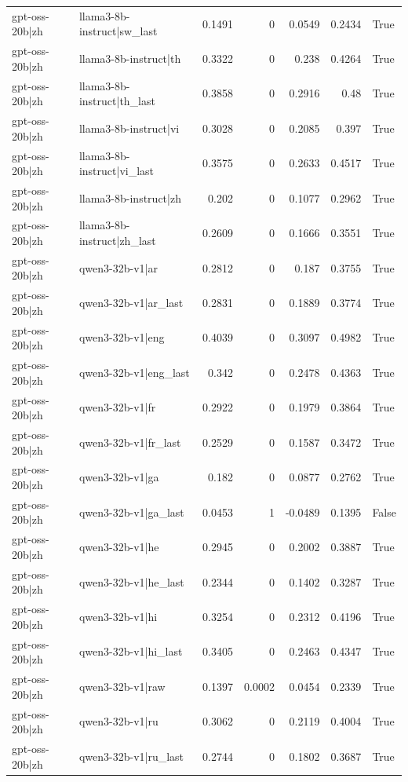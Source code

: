\begin{table}
\begin{tabular}{l l r r r r l}
gpt-oss-20b|zh & llama3-8b-instruct|sw_last & 0.1491 & 0 & 0.0549 & 0.2434 & True \\
gpt-oss-20b|zh & llama3-8b-instruct|th & 0.3322 & 0 & 0.238 & 0.4264 & True \\
gpt-oss-20b|zh & llama3-8b-instruct|th_last & 0.3858 & 0 & 0.2916 & 0.48 & True \\
gpt-oss-20b|zh & llama3-8b-instruct|vi & 0.3028 & 0 & 0.2085 & 0.397 & True \\
gpt-oss-20b|zh & llama3-8b-instruct|vi_last & 0.3575 & 0 & 0.2633 & 0.4517 & True \\
gpt-oss-20b|zh & llama3-8b-instruct|zh & 0.202 & 0 & 0.1077 & 0.2962 & True \\
gpt-oss-20b|zh & llama3-8b-instruct|zh_last & 0.2609 & 0 & 0.1666 & 0.3551 & True \\
gpt-oss-20b|zh & qwen3-32b-v1|ar & 0.2812 & 0 & 0.187 & 0.3755 & True \\
gpt-oss-20b|zh & qwen3-32b-v1|ar_last & 0.2831 & 0 & 0.1889 & 0.3774 & True \\
gpt-oss-20b|zh & qwen3-32b-v1|eng & 0.4039 & 0 & 0.3097 & 0.4982 & True \\
gpt-oss-20b|zh & qwen3-32b-v1|eng_last & 0.342 & 0 & 0.2478 & 0.4363 & True \\
gpt-oss-20b|zh & qwen3-32b-v1|fr & 0.2922 & 0 & 0.1979 & 0.3864 & True \\
gpt-oss-20b|zh & qwen3-32b-v1|fr_last & 0.2529 & 0 & 0.1587 & 0.3472 & True \\
gpt-oss-20b|zh & qwen3-32b-v1|ga & 0.182 & 0 & 0.0877 & 0.2762 & True \\
gpt-oss-20b|zh & qwen3-32b-v1|ga_last & 0.0453 & 1 & -0.0489 & 0.1395 & False \\
gpt-oss-20b|zh & qwen3-32b-v1|he & 0.2945 & 0 & 0.2002 & 0.3887 & True \\
gpt-oss-20b|zh & qwen3-32b-v1|he_last & 0.2344 & 0 & 0.1402 & 0.3287 & True \\
gpt-oss-20b|zh & qwen3-32b-v1|hi & 0.3254 & 0 & 0.2312 & 0.4196 & True \\
gpt-oss-20b|zh & qwen3-32b-v1|hi_last & 0.3405 & 0 & 0.2463 & 0.4347 & True \\
gpt-oss-20b|zh & qwen3-32b-v1|raw & 0.1397 & 0.0002 & 0.0454 & 0.2339 & True \\
gpt-oss-20b|zh & qwen3-32b-v1|ru & 0.3062 & 0 & 0.2119 & 0.4004 & True \\
gpt-oss-20b|zh & qwen3-32b-v1|ru_last & 0.2744 & 0 & 0.1802 & 0.3687 & True \\

\end{tabular}
\end{table}
